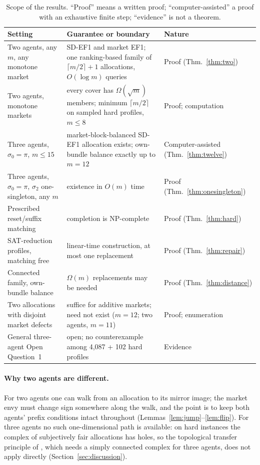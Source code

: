 \documentclass[sigconf,anonymous]{aamas}
\begin{document}
\begin{table}[t]
\caption{Scope of the results. ``Proof'' means a written proof; ``computer-assisted'' a proof with an exhaustive finite step; ``evidence'' is not a theorem.}
\label{tab:scope}
\small
\begin{tabular}{@{}p{}p{}p{}@{}}
\toprule
Setting & Guarantee or boundary & Nature\\
\midrule
Two agents, any $m$, any monotone market & SD-EF1 and market EF1; one ranking-based family of $\lceil m/2\rceil+1$ allocations, $O(\log m)$ queries & Proof (Thm.~\ref{thm:two})\\
Two agents, monotone markets & every cover has $\Omega(\sqrt m)$ members; minimum $\lceil m/2\rceil$ on sampled hard profiles, $m\le8$ & Proof; computation\\
Three agents, $\sigma_0=\pi$, $m\le15$ & market-block-balanced SD-EF1 allocation exists; own-bundle balance exactly up to $m=12$ & Computer-assisted (Thm.~\ref{thm:twelve})\\
Three agents, $\sigma_0=\pi$, $\sigma_2$ one-singleton, any $m$ & existence in $O(m)$ time & Proof (Thm.~\ref{thm:onesingleton})\\
Prescribed reset/suffix matching & completion is NP-complete & Proof (Thm.~\ref{thm:hard})\\
SAT-reduction profiles, matching free & linear-time construction, at most one replacement & Proof (Thm.~\ref{thm:repair})\\
Connected family, own-bundle balance & $\Omega(m)$ replacements may be needed & Proof (Thm.~\ref{thm:distance})\\
Two allocations with disjoint market defects & suffice for additive markets; need not exist ($m=12$; two agents, $m=11$) & Proof; enumeration\\
General three-agent Open Question~1 & open; no counterexample among 4{,}087 + 102 hard profiles & Evidence\\
\bottomrule
\end{tabular}
\end{table}

\paragraph{Why two agents are different.}
For two agents one can walk from an allocation to its mirror image; the market envy must change sign somewhere along the walk, and the point is to keep both agents' prefix conditions intact throughout (Lemmas~\ref{lem:jump}--\ref{lem:flip}). For three agents no such one-dimensional path is available: on hard instances the complex of subjectively fair allocations has holes, so the topological transfer principle of \citet{dupre2026balanced}, which needs a simply connected complex for three agents, does not apply directly (Section~\ref{sec:discussion}).
\end{document}

